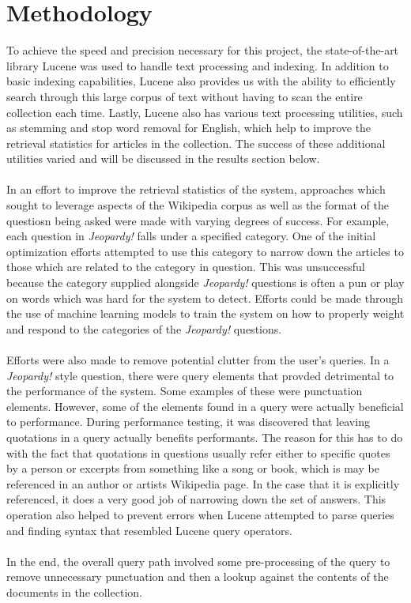 \documentclass{article}%
\begin{document}
\section*{Methodology}
To achieve the speed and precision necessary for this project, the state-of-the-art library Lucene was used to handle text
processing and indexing. In addition to basic indexing capabilities, Lucene also provides us with the ability to efficiently
search through this large corpus of text without having to scan the entire collection each time. Lastly, Lucene also has various
text processing utilities, such as stemming and stop word removal for English, which help to improve the retrieval statistics
for articles in the collection. The success of these additional utilities varied and will be discussed in the results section
below.\\
\\
In an effort to improve the retrieval statistics of the system, approaches which sought to leverage aspects of the Wikipedia corpus
as well as the format of the questiosn being asked were made with varying degrees of success. For example, each question in
\textit{Jeopardy!} falls under a specified category. One of the initial optimization efforts attempted to use this category
to narrow down the articles to those which are related to the category in question. This was unsuccessful because the category supplied
alongside \textit{Jeopardy!} questions is often a pun or play on words which was hard for the system to detect. Efforts could be
made through the use of machine learning models to train the system on how to properly weight and respond to the categories of the
\textit{Jeopardy!} questions.\\
\\
Efforts were also made to remove potential clutter from the user's queries. In a \textit{Jeopardy!} style question, there were
query elements that provded detrimental to the performance of the system. Some examples of these were punctuation elements.
However, some of the elements found in a query were actually beneficial to performance. During performance testing, it was discovered
that leaving quotations in a query actually benefits performants. The reason for this has to do with the fact that quotations in
questions usually refer either to specific quotes by a person or excerpts from something like a song or book, which is may be
referenced in an author or artists Wikipedia page. In the case that it is explicitly referenced, it does a very good job of
narrowing down the set of answers. This operation also helped to prevent errors when Lucene attempted to parse queries and finding
syntax that resembled Lucene query operators.\\
\\
In the end, the overall query path involved some pre-processing of the query to remove unnecessary punctuation and then a lookup
against the contents of the documents in the collection.
\end{document}
